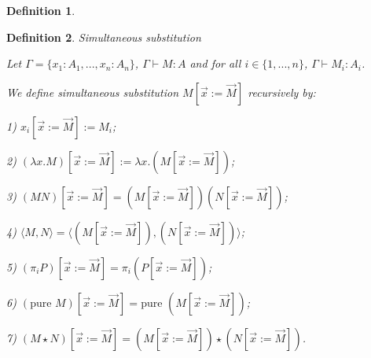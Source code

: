 \documentclass[a4paper]{article}
\newtheorem{defin}{Definition}
\begin{document}
\begin{defin}
\begin{prooftree}
\end{prooftree}

\begin{prooftree}
\end{prooftree}

\begin{prooftree}
\end{prooftree}

\begin{prooftree}
\end{prooftree}

\end{defin}

\begin{defin} Simultaneous substitution

Let $\Gamma = \{ x_1 : A_1, ..., x_n : A_n \}$, $\Gamma \vdash M : A$ and for all $i \in \{ 1,..., n \}$,
$\Gamma \vdash M_i : A_i$.

We define simultaneous substitution $M [ \vec{x} := \vec{M}]$ recursively by:

1) $x_i [ \vec{x} := \vec{M}] := M_i $;

2) $(\lambda x. M) [ \vec{x} := \vec{M}] := \lambda x. (M [ \vec{x} := \vec{M}])$;

3) $(M N) [ \vec{x} := \vec{M}] = (M [ \vec{x} := \vec{M}]) (N [ \vec{x} := \vec{M}])$;

4) $\langle M, N \rangle = \langle (M [ \vec{x} := \vec{M}]), (N [ \vec{x} := \vec{M}])\rangle$;

5) $(\pi_i P) [ \vec{x} := \vec{M}] = \pi_i (P [ \vec{x} := \vec{M}])$;

6) $(\text{pure } M) [ \vec{x} := \vec{M}] = \text{pure } (M [ \vec{x} := \vec{M}])$;

7) $(M \star N) [ \vec{x} := \vec{M}] = (M [ \vec{x} := \vec{M}])
\star (N [ \vec{x} := \vec{M}])$.

\end{defin}
\end{document}
